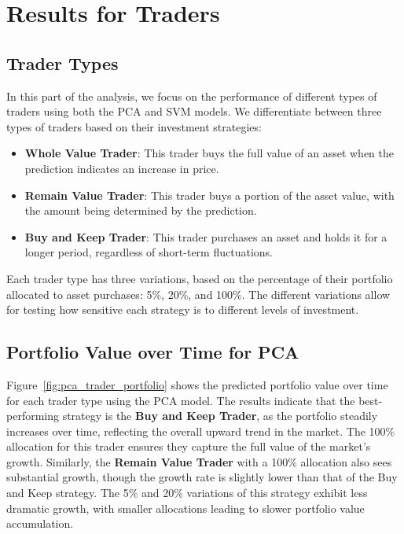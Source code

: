 \documentclass[journal]{IEEEtran}
\begin{document}
\section{Results for Traders}

\subsection{Trader Types}

In this part of the analysis, we focus on the performance of different types of traders using both the PCA and SVM models. We differentiate between three types of traders based on their investment strategies: 
\begin{itemize}
    \item \textbf{Whole Value Trader}: This trader buys the full value of an asset when the prediction indicates an increase in price.
    \item \textbf{Remain Value Trader}: This trader buys a portion of the asset value, with the amount being determined by the prediction. 
    \item \textbf{Buy and Keep Trader}: This trader purchases an asset and holds it for a longer period, regardless of short-term fluctuations.
\end{itemize}

Each trader type has three variations, based on the percentage of their portfolio allocated to asset purchases: 5\%, 20\%, and 100\%. The different variations allow for testing how sensitive each strategy is to different levels of investment.

\subsection{Portfolio Value over Time for PCA}

Figure~\ref{fig:pca_trader_portfolio} shows the predicted portfolio value over time for each trader type using the PCA model. The results indicate that the best-performing strategy is the \textbf{Buy and Keep Trader}, as the portfolio steadily increases over time, reflecting the overall upward trend in the market. The 100\% allocation for this trader ensures they capture the full value of the market's growth. Similarly, the \textbf{Remain Value Trader} with a 100\% allocation also sees substantial growth, though the growth rate is slightly lower than that of the Buy and Keep strategy. The 5\% and 20\% variations of this strategy exhibit less dramatic growth, with smaller allocations leading to slower portfolio value accumulation.
\end{document}
